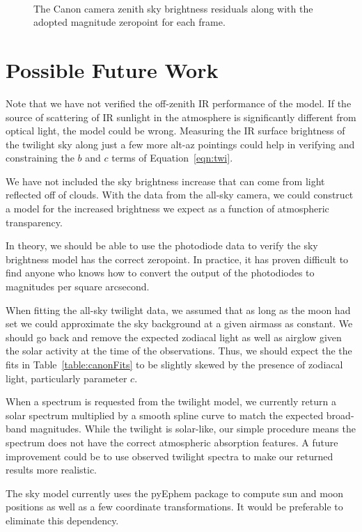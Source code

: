 \documentclass{emulateapj}  %
\begin{document}
\begin{figure*}
   \\
  \caption{The Canon camera zenith sky brightness residuals along with the adopted magnitude zeropoint for each frame. \label{fig:timeOfYear}}
\end{figure*}


\section{Possible Future Work}

Note that we have not verified the off-zenith IR performance of the model. If the source of scattering of IR sunlight in the atmosphere is significantly different from optical light, the model could be wrong. Measuring the IR surface brightness of the twilight sky along just a few more alt-az pointings could help in verifying and constraining the $b$ and $c$ terms of Equation~\ref{eqn:twi}.

We have not included the sky brightness increase that can come from light reflected off of clouds.  With the data from the all-sky camera, we could construct a model for the increased brightness we expect as a function of atmospheric transparency.  

In theory, we should be able to use the photodiode data to verify the sky brightness model has the correct zeropoint. In practice, it has proven difficult to find anyone who knows how to convert the output of the photodiodes to magnitudes per square arcsecond.

When fitting the all-sky twilight data, we assumed that as long as the moon had set we could approximate the sky background at a given airmass as constant. We should go back and remove the expected zodiacal light as well as airglow given the solar activity at the time of the observations. Thus, we should expect the the fits in Table~\ref{table:canonFits} to be slightly skewed by the presence of zodiacal light, particularly parameter $c$.  

When a spectrum is requested from the twilight model, we currently return a solar spectrum multiplied by a smooth spline curve to match the expected broad-band magnitudes.  While the twilight is solar-like, our simple procedure means the spectrum does not have the correct atmospheric absorption features.  A future improvement could be to use observed twilight spectra to make our returned results more realistic.

The sky model currently uses the pyEphem package to compute sun and moon positions as well as a few coordinate transformations. It would be preferable to eliminate this dependency.  



\end{document}
